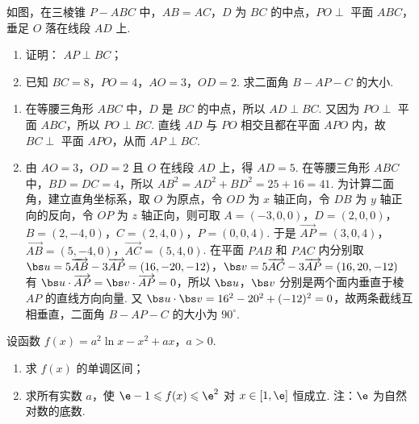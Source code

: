 \begin{problem}
如图，在三棱锥 \(P - ABC\) 中，\(AB = AC\)，\(D\) 为 \(BC\) 的中点，\(PO \perp\) 平面 \(ABC\)，垂足 \(O\) 落在线段 \(AD\) 上.
\begin{enumerate}
\item 证明： \(AP \perp BC\)；
\item 已知 \(BC = 8\)，\(PO = 4\)，\(AO = 3\)，\(OD = 2\). 求二面角 \(B - AP - C\) 的大小.
\end{enumerate}
\end{problem}

\begin{solution}
\begin{enumerate}
\item 在等腰三角形 \(ABC\) 中，\(D\) 是 \(BC\) 的中点，所以 \(AD\perp BC\). 又因为 \(PO\perp\) 平面 \(ABC\)，所以 \(PO\perp BC\). 直线 \(AD\) 与 \(PO\) 相交且都在平面 \(APO\) 内，故 \(BC\perp\) 平面 \(APO\)，从而 \(AP\perp BC\).
\item 由 \(AO=3\)，\(OD=2\) 且 \(O\) 在线段 \(AD\) 上，得 \(AD=5\). 在等腰三角形 \(ABC\) 中，\(BD=DC=4\)，所以 \(AB^2=AD^2+BD^2=25+16=41\). 为计算二面角，建立直角坐标系，取 \(O\) 为原点，令 \(OD\) 为 \(x\) 轴正向，令 \(DB\) 为 \(y\) 轴正向的反向，令 \(OP\) 为 \(z\) 轴正向，则可取 \(A=(-3,0,0)\)，\(D=(2,0,0)\)，\(B=(2,-4,0)\)，\(C=(2,4,0)\)，\(P=(0,0,4)\). 于是 \(\overrightarrow{AP}=(3,0,4)\)，\(\overrightarrow{AB}=(5,-4,0)\)，\(\overrightarrow{AC}=(5,4,0)\). 在平面 \(PAB\) 和 \(PAC\) 内分别取
\(\bs u=5\overrightarrow{AB}-3\overrightarrow{AP}=(16,-20,-12)\)，\(\bs v=5\overrightarrow{AC}-3\overrightarrow{AP}=(16,20,-12)\)
有 \(\bs u\cdot\overrightarrow{AP}=\bs v\cdot\overrightarrow{AP}=0\)，所以 \(\bs u\)，\(\bs v\) 分别是两个面内垂直于棱 \(AP\) 的直线方向向量. 又 \(\bs u\cdot\bs v=16^2-20^2+(-12)^2=0\)，故两条截线互相垂直，二面角 \(B-AP-C\) 的大小为 \(90^\circ\).
\end{enumerate}
\end{solution}

\begin{problem}
设函数 \(f(x) = a^2 \ln x - x^2 + ax\)，\(a > 0\).
\begin{enumerate}
\item 求 \( f(x) \) 的单调区间；
\item 求所有实数 \(a\)，使 \(\e - 1 \leqslant f(x) \leqslant \e^{2}\) 对 \(x \in [1, \e]\) 恒成立. 注：\(\e\) 为自然对数的底数.
\end{enumerate}
\end{problem}

